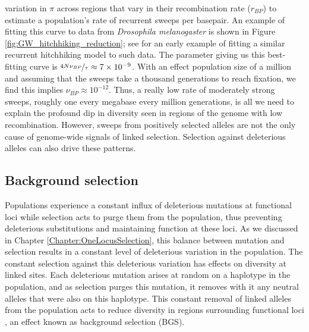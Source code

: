 variation in $\pi$ across regions that vary in their recombination
rate ($r_{BP}$) to estimate a population's rate of recurrent sweeps per basepair.  An example of fitting this curve to data from
{\it Drosophila melanogaster} is shown in Figure
\ref{fig:GW_hitchhiking_reduction}; see \citet{wiehe1993analysis} for
an early example of fitting a similar recurrent hitchhiking model to such data. The parameter giving us this
best-fitting curve is $\nicefrac{4N\nu_{BP}}{ \tau} \approx 7 \times 10^{-9}$. With an
  effect population size of a million  and assuming that the sweeps take
  a thousand generations to reach fixation, we find this implies
  $\nu_{BP} \approx 10^{-12}$. Thus, a really low rate of
  moderately strong sweeps, roughly one every megabase every million
  generations, is all we need to explain the profound dip in diversity seen in regions
  of the genome with low recombination. However, sweeps from positively selected
  alleles are not the only cause of genome-wide signals of linked
  selection. Selection against deleterious alleles can also drive these
  patterns.    

\subsection{Background selection}

Populations experience a constant influx of
deleterious mutations at functional loci while selection acts to purge
them from the population, thus preventing deleterious substitutions and maintaining function at these loci. As
we discussed in Chapter \ref{Chapter:OneLocusSelection}, this balance between mutation and selection results
in a constant level of deleterious variation in the population. The
constant selection against this deleterious variation has effects on diversity at linked
sites. Each deleterious mutation arises at random on a haplotype in the
population, and as selection purges this mutation, it removes with it any neutral alleles that were also on this
haplotype. This constant removal of linked alleles from the population
acts to reduce diversity in regions surrounding functional loci
\citep{Hudson:95b,Nordborg:96}, an effect known as background
selection (BGS).

